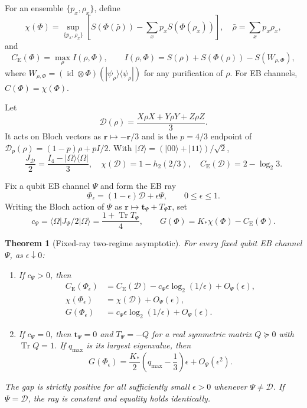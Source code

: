 \documentclass[aip,jmp,reprint,amsmath,amssymb]{revtex4-2}
\newtheorem{theorem}{Theorem}
\newcommand{\D}{\mathcal{D}}
\newcommand{\Tr}{\operatorname{Tr}}
\newcommand{\id}{\operatorname{id}}
\newcommand{\eps}{\epsilon}
\newcommand{\CE}{C_{\mathrm E}}
\newcommand{\ketbra}[2]{|#1\rangle\!\langle#2|}
\begin{document}
For an ensemble $\{p_x,\rho_x\}$, define
\begin{equation}
 \chi(\Phi)=\sup_{\{p_x,\rho_x\}}
 \left[S\!\left(\Phi(\bar\rho)\right)
 -\sum_xp_xS\!\left(\Phi(\rho_x)\right)\right],
 \quad \bar\rho=\sum_xp_x\rho_x,
 \label{eq:holevo}
\end{equation}
and
\begin{equation}
 \CE(\Phi)=\max_\rho I(\rho,\Phi),\qquad
 I(\rho,\Phi)=S(\rho)+S(\Phi(\rho))-S(W_{\rho,\Phi}),
 \label{eq:ce}
\end{equation}
where $W_{\rho,\Phi}=(\id\otimes\Phi)(\ketbra{\psi_\rho}{\psi_\rho})$ for any purification of $\rho$.  For EB channels, $C(\Phi)=\chi(\Phi)$.\cite{Shor2002}

Let
\begin{equation}
 \D(\rho)=\frac{X\rho X+Y\rho Y+Z\rho Z}{3}.
 \label{eq:D}
\end{equation}
It acts on Bloch vectors as $\bm r\mapsto-\bm r/3$ and is the $p=4/3$ endpoint of $\D_p(\rho)=(1-p)\rho+pI/2$.  With $|\Omega\rangle=(|00\rangle+|11\rangle)/\sqrt2$,
\begin{equation}
 \frac{J_\D}{2}=\frac{I_4-\ketbra{\Omega}{\Omega}}{3},\quad
 \chi(\D)=1-h_2(2/3),\quad
 \CE(\D)=2-\log_2 3.
 \label{eq:endpoint}
\end{equation}

Fix a qubit EB channel $\Psi$ and form the EB ray
\begin{equation}
 \Phi_\eps=(1-\eps)\D+\eps\Psi,\qquad 0\leq\eps\leq1.
 \label{eq:ray}
\end{equation}
Writing the Bloch action of $\Psi$ as $\bm r\mapsto\bm t_\Psi+T_\Psi\bm r$, set
\begin{equation}
 c_\Psi=\langle\Omega|J_\Psi/2|\Omega\rangle
 =\frac{1+\Tr T_\Psi}{4},\qquad
 G(\Phi)=K_*\chi(\Phi)-\CE(\Phi).
 \label{eq:candG}
\end{equation}

\begin{theorem}[Fixed-ray two-regime asymptotic]
\label{thm:main}
For every fixed qubit EB channel $\Psi$, as $\eps\downarrow0$:
\begin{enumerate}
 \item If $c_\Psi>0$, then
 \begin{align}
  \CE(\Phi_\eps)&=\CE(\D)-c_\Psi\eps\log_2(1/\eps)+O_\Psi(\eps),\label{eq:cepositive}\\
  \chi(\Phi_\eps)&=\chi(\D)+O_\Psi(\eps),\label{eq:chipositive}\\
  G(\Phi_\eps)&=c_\Psi\eps\log_2(1/\eps)+O_\Psi(\eps).\label{eq:gpositive}
 \end{align}
 \item If $c_\Psi=0$, then $\bm t_\Psi=0$ and $T_\Psi=-Q$ for a real symmetric matrix $Q\succeq0$ with $\Tr Q=1$.  If $q_{\max}$ is its largest eigenvalue, then
 \begin{equation}
  G(\Phi_\eps)=\frac{K_*}{2}\left(q_{\max}-\frac13\right)\eps+O_\Psi(\eps^2).
  \label{eq:gzero}
 \end{equation}
\end{enumerate}
The gap is strictly positive for all sufficiently small $\eps>0$ whenever $\Psi\neq\D$.  If $\Psi=\D$, the ray is constant and equality holds identically.
\end{theorem}
\end{document}
